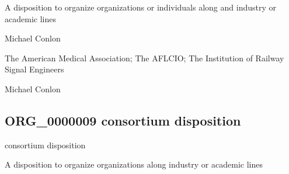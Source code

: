 \documentclass[letterpaper,10pt,english]{sphinxmanual}
\begin{document}
\begin{sphinxShadowBox}

\sphinxAtStartPar
A disposition to organize organizations or individuals along and industry or academic lines
\end{sphinxShadowBox}

\begin{sphinxShadowBox}

\sphinxAtStartPar
Michael Conlon 
\end{sphinxShadowBox}

\begin{sphinxShadowBox}

\sphinxAtStartPar
The American Medical Association; The AFL\sphinxhyphen{}CIO; The Institution of Railway Signal Engineers
\end{sphinxShadowBox}

\begin{sphinxShadowBox}

\sphinxAtStartPar
Michael Conlon 
\end{sphinxShadowBox}
\begin{quote}

\ignorespaces \end{quote}


\subsection{ORG\_0000009 \sphinxhyphen{} consortium disposition}
\label{\detokenize{doc-ORG_0000009:org-0000009-consortium-disposition}}\label{\detokenize{doc-ORG_0000009:index-0}}\label{\detokenize{doc-ORG_0000009::doc}}
\begin{sphinxShadowBox}

\sphinxAtStartPar
consortium disposition
\end{sphinxShadowBox}

\begin{sphinxShadowBox}

\sphinxAtStartPar
A disposition to organize organizations along industry or academic lines
\end{sphinxShadowBox}
\end{document}
